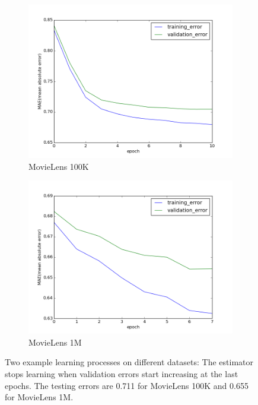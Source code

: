 \documentclass[twocolumn]{article}
\begin{document}
\begin{figure}[h]
	\centering
	\begin{subfigure}{0.4\textwidth}
		\includegraphics[width=\textwidth]{movieLens100K}
		\caption{MovieLens 100K}
		\label{fig:movieLens100K}
	\end{subfigure}
	\begin{subfigure}{0.4\textwidth}
		\includegraphics[width=\textwidth]{movieLens1M}
		\caption{MovieLens 1M}
		\label{fig:movieLens1M}
	\end{subfigure}
	\caption{Two example learning processes on different datasets:
	The estimator stops learning when validation errors start increasing at 
	the last epochs. 
	The testing errors are 0.711 for MovieLens 100K and 0.655 for MovieLens 1M.}
	\label{fig:trainnig}
\end{figure}
\end{document}
